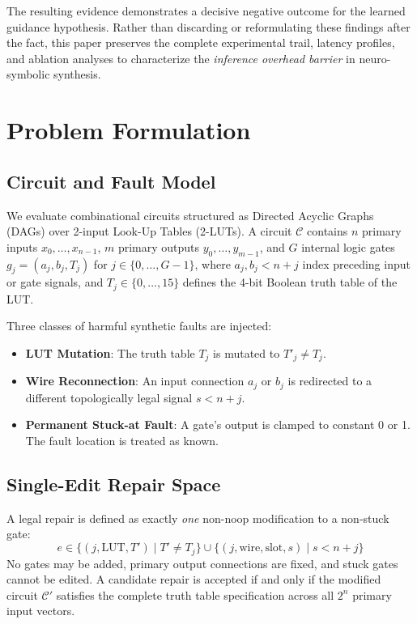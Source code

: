 \documentclass[10pt,journal,compsoc]{IEEEtran}
\begin{document}
The resulting evidence demonstrates a decisive negative outcome for the learned guidance hypothesis. Rather than discarding or reformulating these findings after the fact, this paper preserves the complete experimental trail, latency profiles, and ablation analyses to characterize the \textit{inference overhead barrier} in neuro-symbolic synthesis.

\section{Problem Formulation}

\subsection{Circuit and Fault Model}
We evaluate combinational circuits structured as Directed Acyclic Graphs (DAGs) over 2-input Look-Up Tables (2-LUTs). A circuit $\mathcal{C}$ contains $n$ primary inputs $x_0, \dots, x_{n-1}$, $m$ primary outputs $y_0, \dots, y_{m-1}$, and $G$ internal logic gates $g_j = (a_j, b_j, T_j)$ for $j \in \{0, \dots, G-1\}$, where $a_j, b_j < n + j$ index preceding input or gate signals, and $T_j \in \{0, \dots, 15\}$ defines the 4-bit Boolean truth table of the LUT.

Three classes of harmful synthetic faults are injected:
\begin{itemize}
    \item \textbf{LUT Mutation}: The truth table $T_j$ is mutated to $T'_j \ne T_j$.
    \item \textbf{Wire Reconnection}: An input connection $a_j$ or $b_j$ is redirected to a different topologically legal signal $s < n + j$.
    \item \textbf{Permanent Stuck-at Fault}: A gate's output is clamped to constant 0 or 1. The fault location is treated as known.
\end{itemize}

\subsection{Single-Edit Repair Space}
A legal repair is defined as exactly \textit{one} non-noop modification to a non-stuck gate:
\begin{equation}
    e \in \{(j, \text{LUT}, T') \mid T' \ne T_j\} \cup \{(j, \text{wire}, \text{slot}, s) \mid s < n + j\}
\end{equation}
No gates may be added, primary output connections are fixed, and stuck gates cannot be edited. A candidate repair is accepted if and only if the modified circuit $\mathcal{C}'$ satisfies the complete truth table specification across all $2^n$ primary input vectors.
\end{document}

